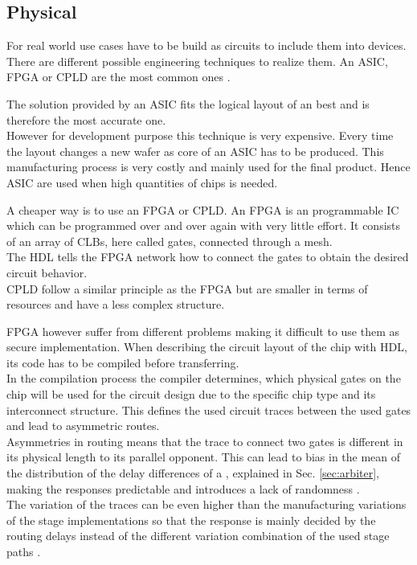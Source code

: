 \subsection{Physical}
\label{sec:physical}

For real world use cases \apufs have to be build as circuits to include them into devices.
There are different possible engineering techniques to realize them.
An \ac{ASIC}, \ac{FPGA} or \ac{CPLD} are the most common ones \cite{Maes2012ExperimentalCMOS, Majzoobi2010FPGALines, Soybali2011ImplementationFPGA, Tajik2014PhysicalPUFs}.

The solution provided by an \ac{ASIC} fits the logical layout of an \apuf best and is therefore the most accurate one.\\
However for development purpose this technique is very expensive.
Every time the layout changes a new wafer as core of an \ac{ASIC} has to be produced.
This manufacturing process is very costly and mainly used for the final product.
Hence \ac{ASIC} are used when high quantities of chips is needed.

A cheaper way is to use an \ac{FPGA} or \ac{CPLD}. 
An \ac{FPGA} is an programmable \ac{IC} which can be programmed over and over again with very little effort.
It consists of an array of \acp{CLB}, here called gates, connected through a mesh.\\
The \ac{HDL} tells the \ac{FPGA} network how to connect the gates to obtain the desired circuit behavior.\\
\ac{CPLD} follow a similar principle as the \ac{FPGA} but are smaller in terms of resources and have a less complex structure.

\ac{FPGA} however suffer from different problems making it difficult to use them as secure \apuf implementation.
When describing the circuit layout of the chip with \ac{HDL}, its code has to be compiled before transferring.\\
In the compilation process the compiler determines, which physical gates on the chip will be used for the circuit design due to the specific chip type and its interconnect structure.
This defines the used circuit traces between the used gates and lead to asymmetric routes.\\ %
Asymmetries in routing means that the trace to connect two gates is different in its physical length to its parallel opponent.
This can lead to bias in the mean of the distribution of the delay differences of a \apuf, explained in Sec. \ref{sec:arbiter}, making the responses predictable and introduces a lack of randomness \cite{Majzoobi2010FPGALines, Morozov2010AnFPGA}.\\
The variation of the traces can be even higher than the manufacturing variations of the stage implementations so that the response is mainly decided by the routing delays instead of the different variation combination of the used stage paths \cite{Majzoobi2009TechniquesPUFs}.

